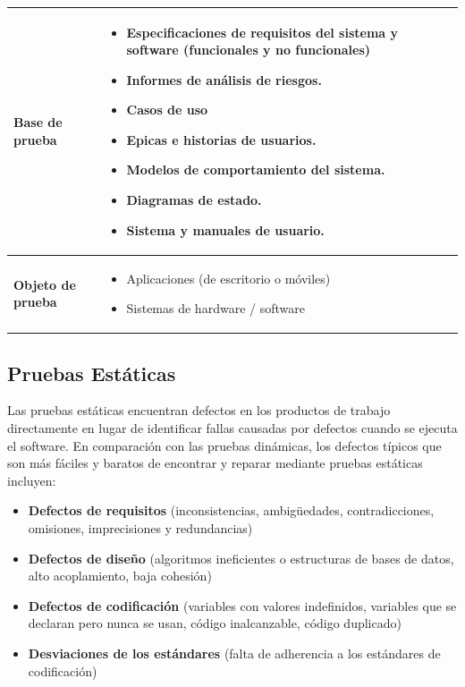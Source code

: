 \begin{table}[H]
	\centering
	\begin{tabular}{|p{3.5cm}|p{13cm}|}
		\hline
		\centering \textbf{Base de prueba} & \begin{itemize}
			\item Especificaciones de requisitos del sistema y software (funcionales y no funcionales)
			\item Informes de análisis de riesgos.
			\item Casos de uso
			\item Epicas e historias de usuarios.
			\item Modelos de comportamiento del sistema.
			\item Diagramas de estado.
			\item Sistema y manuales de usuario.
		\end{itemize}
		  \\
		\hline
		\centering \textbf{Objeto de prueba} & \begin{itemize}
			\item Aplicaciones (de escritorio o móviles)
			\item Sistemas de hardware / software
		\end{itemize}  \\
		\hline
	\end{tabular}
\end{table}


\subsection{Pruebas Estáticas}

Las pruebas estáticas encuentran defectos en los productos de trabajo directamente en lugar de identificar fallas causadas por defectos cuando se ejecuta el software.  En comparación con las pruebas dinámicas, los defectos típicos que son más fáciles y baratos de encontrar y reparar mediante pruebas estáticas incluyen:
\begin{itemize}
	\item \textbf {Defectos de requisitos} (inconsistencias, ambigüedades, contradicciones, omisiones, imprecisiones y redundancias)
	\item \textbf {Defectos de diseño} (algoritmos ineficientes o estructuras de bases de datos, alto acoplamiento, baja cohesión)
	\item \textbf {Defectos de codificación} (variables con valores indefinidos, variables que se declaran pero nunca se usan, código inalcanzable, código duplicado)
	\item \textbf {Desviaciones de los estándares} (falta de adherencia a los estándares de codificación)
\end{itemize}

